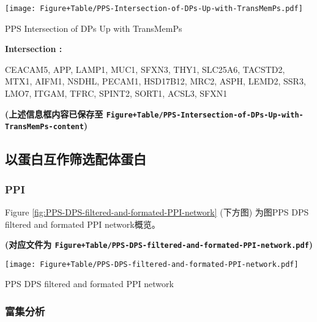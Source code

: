 \documentclass[
]{article}
\begin{document}
\def\@captype{figure}
\begin{center}
\texttt{[image: Figure+Table/PPS-Intersection-of-DPs-Up-with-TransMemPs.pdf]}
\caption{PPS Intersection of DPs Up with TransMemPs}\label{fig:PPS-Intersection-of-DPs-Up-with-TransMemPs}
\end{center}
\begin{center}\begin{tcolorbox}[colback=gray!10, colframe=gray!50, width=0.9\linewidth, arc=1mm, boxrule=0.5pt]
\textbf{
Intersection
:}

\vspace{0.5em}

    CEACAM5, APP, LAMP1, MUC1, SFXN3, THY1, SLC25A6,
TACSTD2, MTX1, AIFM1, NSDHL, PECAM1, HSD17B12, MRC2, ASPH,
LEMD2, SSR3, LMO7, ITGAM, TFRC, SPINT2, SORT1, ACSL3, SFXN1

\vspace{2em}
\end{tcolorbox}
\end{center}

\textbf{(上述信息框内容已保存至 \texttt{Figure+Table/PPS-Intersection-of-DPs-Up-with-TransMemPs-content})}

\hypertarget{ux4ee5ux86cbux767dux4e92ux4f5cux7b5bux9009ux914dux4f53ux86cbux767d}{%
\subsection{以蛋白互作筛选配体蛋白}\label{ux4ee5ux86cbux767dux4e92ux4f5cux7b5bux9009ux914dux4f53ux86cbux767d}}

\hypertarget{ppi}{%
\subsubsection{PPI}\label{ppi}}

Figure \ref{fig:PPS-DPS-filtered-and-formated-PPI-network} (下方图) 为图PPS DPS filtered and formated PPI network概览。

\textbf{(对应文件为 \texttt{Figure+Table/PPS-DPS-filtered-and-formated-PPI-network.pdf})}

\def\@captype{figure}
\begin{center}
\texttt{[image: Figure+Table/PPS-DPS-filtered-and-formated-PPI-network.pdf]}
\caption{PPS DPS filtered and formated PPI network}\label{fig:PPS-DPS-filtered-and-formated-PPI-network}
\end{center}

\hypertarget{ux5bccux96c6ux5206ux6790}{%
\subsubsection{富集分析}\label{ux5bccux96c6ux5206ux6790}}
\end{document}
